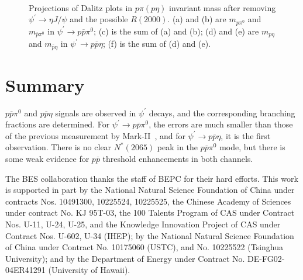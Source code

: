 \documentclass[prd,twocolumn,showpacs,amsmath,amssymb]{revtex4}
\newcommand{\psip}{\psi^\prime}
\newcommand{\jpsi}{J/\psi}
\newcommand{\piz}{\pi^0}
\newcommand{\ppb}{p\overline{p}}
\newcommand{\RR}{R(2000)}
\newcommand{\psipto}{\psi^\prime \rightarrow }
\newcommand{\pspto}{\psi^\prime \rightarrow }
\begin{document}
\begin{figure*}[htb]
\centerline{\hbox{ }}
\caption{Projections of Dalitz plots in $p\pi(p\eta)$ invariant
mass after removing $\pspto \eta\jpsi$ and the possible $\RR$. (a)
and (b) are $m_{p\piz}$ and $m_{\overline{p}\piz}$ in $\pspto \ppb
\piz$; (c) is the sum of (a) and (b); (d) and (e) are $m_{p\eta}$
and $m_{\overline{p}\eta}$ in $\pspto \ppb \eta$; (f) is the sum
of (d) and (e).} \label{res2}
\end{figure*}

\section{Summary}

$\ppb\piz$ and $\ppb\eta$ signals are observed in $\psip$ decays,
and the corresponding branching fractions are determined. For
$\psipto\ppb\piz$, the errors are much smaller than those of the
previous measurement by Mark-II~\cite{markii}, and for
$\psipto\ppb\eta$, it is the first observation. There is no clear
$N^*(2065)$ peak in the $\ppb\piz$ mode, but there is some weak
evidence for $\ppb$ threshold enhancements in both channels.

\acknowledgments

The BES collaboration thanks the staff of BEPC for their hard
efforts. This work is supported in part by the National Natural
Science Foundation of China under contracts Nos. 10491300,
10225524, 10225525, the Chinese Academy of Sciences under contract
No. KJ 95T-03, the 100 Talents Program of CAS under Contract Nos.
U-11, U-24, U-25, and the Knowledge Innovation Project of CAS
under Contract Nos. U-602, U-34 (IHEP); by the National Natural
Science Foundation of China under Contract No. 10175060 (USTC),
and No. 10225522 (Tsinghua University); and by the Department of
Energy under Contract No. DE-FG02-04ER41291 (University of
Hawaii).
\end{document}
